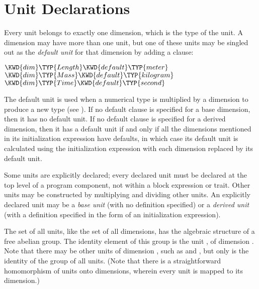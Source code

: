 \section{Unit Declarations}
Every unit belongs to exactly one dimension, which is the type of the unit.
A dimension may have more than one unit,
but one of these units may be singled out as the \emph{default unit} for that dimension
by adding a  clause:
\begin{Fortress}
\(\KWD{dim} \TYP{Length} \KWD{default} \TYP{meter}\)\\
\(\KWD{dim} \TYP{Mass} \KWD{default} \TYP{kilogram}\)\\
\(\KWD{dim} \TYP{Time} \KWD{default} \TYP{second}\)
\end{Fortress}
The default unit is used when a numerical type is multiplied by a
dimension to produce a new type (see ).
If no default clause is specified for a base dimension, then it has
no default unit.  If no default clause is specified for a derived
dimension, then it has a default unit if and only if all the
dimensions mentioned in its initialization expression have defaults,
in which case its default unit is calculated using the initialization
expression with each dimension replaced by its default unit.

Some units are explicitly declared;
every declared unit must be declared at the top level of
a program component, not
within a block expression or trait.
Other units may be constructed by multiplying and dividing other units.
An explicitly declared unit may be a \emph{base unit} (with no definition specified)
or a \emph{derived unit} (with a definition specified in the form of an initialization expression).

The set of all units, like the set of all dimensions, has the algebraic structure of a free abelian group.
The identity element of this group is the unit , of
dimension .
Note that there may be other units of dimension , such as
 and , but only  is the
identity of the group of all units.
(Note that there is a straightforward homomorphism of units onto
dimensions, wherein every unit is mapped to its dimension.)

